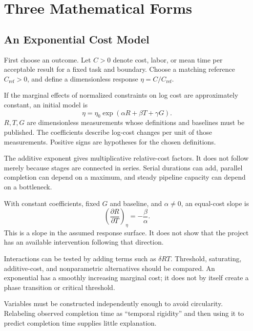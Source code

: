 \section{Three Mathematical Forms}

\subsection{An Exponential Cost Model}

First choose an outcome. Let $C>0$ denote cost, labor, or mean time per acceptable result for a fixed task and boundary. Choose a matching reference $C_{\mathrm{ref}}>0$, and define a dimensionless response $\eta=C/C_{\mathrm{ref}}$.

If the marginal effects of normalized constraints on log cost are approximately constant, an initial model is
\begin{equation}
 \eta=\eta_0\exp(\alpha R+\beta T+\gamma G).
\end{equation}
$R,T,G$ are dimensionless measurements whose definitions and baselines must be published. The coefficients describe log-cost changes per unit of those measurements. Positive signs are hypotheses for the chosen definitions.

The additive exponent gives multiplicative relative-cost factors. It does not follow merely because stages are connected in series. Serial durations can add, parallel completion can depend on a maximum, and steady pipeline capacity can depend on a bottleneck.

With constant coefficients, fixed $G$ and baseline, and $\alpha\neq0$, an equal-cost slope is
\begin{equation}
 \left(\frac{\partial R}{\partial T}\right)_\eta
 =-\frac{\beta}{\alpha}.
\end{equation}
This is a slope in the assumed response surface. It does not show that the project has an available intervention following that direction.

Interactions can be tested by adding terms such as $\delta RT$. Threshold, saturating, additive-cost, and nonparametric alternatives should be compared. An exponential has a smoothly increasing marginal cost; it does not by itself create a phase transition or critical threshold.

Variables must be constructed independently enough to avoid circularity. Relabeling observed completion time as “temporal rigidity” and then using it to predict completion time supplies little explanation.

